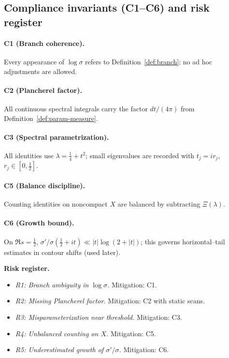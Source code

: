 \subsection{Compliance invariants (C1–C6) and risk register}\relax \hspace{0pt}
\label{subsec:invariants-risks}
\paragraph{C1 (Branch coherence).}\relax
Every appearance of $\log\sigma$ refers to Definition~\ref{def:branch}; no ad hoc adjustments are allowed. %

\paragraph{C2 (Plancherel factor).}\relax
All continuous spectral integrals carry the factor $dt/(4\pi)$ from Definition~\ref{def:param-measure}. %

\paragraph{C3 (Spectral parametrization).}\relax
All identities use $\lambda=\tfrac14+t^2$; small eigenvalues are recorded with $t_j=ir_j$, $r_j\in[0,\tfrac12]$. %

\paragraph{C5 (Balance discipline).}\relax
Counting identities on noncompact $X$ are balanced by subtracting $\Xi(\lambda)$. %

\paragraph{C6 (Growth bound).}\relax
On $\Re s=\tfrac12$, $\sigma'/\sigma(\tfrac12+it)\ll |t|\log(2+|t|)$; this governs horizontal–tail estimates in contour shifts (used later). %

\medskip
\noindent\textbf{Risk register.}\relax
\begin{itemize}
  \item \emph{R1: Branch ambiguity in $\log\sigma$.} Mitigation: C1. %
  \item \emph{R2: Missing Plancherel factor.} Mitigation: C2 with static scans. %
  \item \emph{R3: Misparameterization near threshold.} Mitigation: C3. %
  \item \emph{R4: Unbalanced counting on $X$.} Mitigation: C5. %
  \item \emph{R5: Underestimated growth of $\sigma'/\sigma$.} Mitigation: C6. %
\end{itemize}

